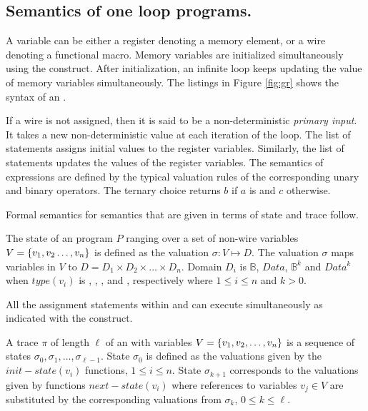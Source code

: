 %
\subsection{Semantics of one loop programs.}
%


A variable can be either a register
denoting a memory element, 
or a wire denoting a functional macro. 
Memory variables are initialized simultaneously using the 
 construct. 
After initialization, an infinite loop keeps updating the 
value of memory variables simultaneously. 
The listings in Figure \ref{fig:gr} shows the syntax of 
an \caig. 



If a wire is not assigned, then it is said to be a 
non-deterministic {\em primary input}. 
It takes a new non-deterministic value at each iteration of 
the loop.
The list of statements  assigns initial values to 
the register variables.
Similarly, the  list of statements updates 
the values of the register variables. 
The semantics of \caig expressions are defined by the typical 
valuation rules of the corresponding unary and binary operators. 
The ternary choice  returns $b$ if $a$ 
is \true and $c$ otherwise. 



Formal semantics for \caig semantics that are given 
in terms of \caig state and trace follow. 



\begin{definition}
The state of an \caig program $P$ ranging over a set of 
non-wire variables $V=\{ v_1,v_2\ldots,v_n \}$ is defined as 
the valuation 
$\sigma: V \mapsto D$. 
The valuation $\sigma$ maps variables in 
$V$ to $D=D_1\times D_2 \times \ldots \times D_n$. 
Domain $D_i$ is $\mathbb{B}$, $Data$,
$\mathbb{B}^k$ and $Data^k$ 
when 
$\mathit{type}(v_i)$ is , , 
, and , respectively 
where $1 \le i \le n$ and $k >0$.
\end{definition}



\begin{definition}
All the assignment statements within  and 
 can execute
simultaneously as indicated with the  
construct.
\end{definition}



\begin{definition}
A trace $\pi$ of length $\ell$ of an \caig with variables 
$V=\{ v_1,v_2,\ldots,v_n \}$ is a sequence 
of \caig states $\sigma_0,\sigma_1,\ldots,\sigma_{\ell -1}$. 
State $\sigma_0$ is defined as the valuations given by 
the $\mathit{init-state}(v_i)$ functions, $1\le i \le n$. 
State $\sigma_{k+1}$ corresponds to the valuations 
given by functions $\mathit{next-state}(v_i)$ 
where references to variables $v_j\in V$ are substituted by 
the corresponding valuations from $\sigma_{k}$, 
$0\le k \le \ell$. 
\end{definition}

